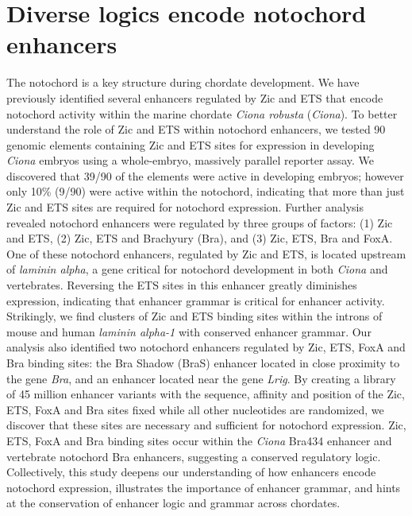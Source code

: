 \chapter{Diverse logics encode notochord enhancers}
\label{chap:Diverse logics encode notochord enhancers}

The notochord is a key structure during chordate development. We have previously identified several enhancers regulated by Zic and ETS that encode notochord activity within the marine chordate \textit{\textit{Ciona} robusta} (\textit{Ciona}). To better understand the role of Zic and ETS within notochord enhancers, we tested 90 genomic elements containing Zic and ETS sites for expression in developing \textit{Ciona} embryos using a whole-embryo, massively parallel reporter assay. We discovered that 39/90 of the elements were active in developing embryos; however only 10\% (9/90) were active within the notochord, indicating that more than just Zic and ETS sites are required for notochord expression. Further analysis revealed notochord enhancers were regulated by three groups of factors: (1) Zic and ETS, (2) Zic, ETS and Brachyury (Bra), and (3) Zic, ETS, Bra and FoxA. One of these notochord enhancers, regulated by Zic and ETS, is located upstream of \textit{laminin alpha}, a gene critical for notochord development in both \textit{Ciona} and vertebrates. Reversing the ETS sites in this enhancer greatly diminishes expression, indicating that enhancer grammar is critical for enhancer activity. Strikingly, we find clusters of Zic and ETS binding sites within the introns of mouse and human \textit{laminin alpha-1} with conserved enhancer grammar. Our analysis also identified two notochord enhancers regulated by Zic, ETS, FoxA and Bra binding sites: the Bra Shadow (BraS) enhancer located in close proximity to the gene \textit{Bra}, and an enhancer located near the gene \textit{Lrig}. By creating a library of 45 million enhancer variants with the sequence, affinity and position of the Zic, ETS, FoxA and Bra sites fixed while all other nucleotides are randomized, we discover that these sites are necessary and sufficient for notochord expression. Zic, ETS, FoxA and Bra binding sites occur within the \textit{Ciona} Bra434 enhancer and vertebrate notochord Bra enhancers, suggesting a conserved regulatory logic. Collectively, this study deepens our understanding of how enhancers encode notochord expression, illustrates the importance of enhancer grammar, and hints at the conservation of enhancer logic and grammar across chordates. 

